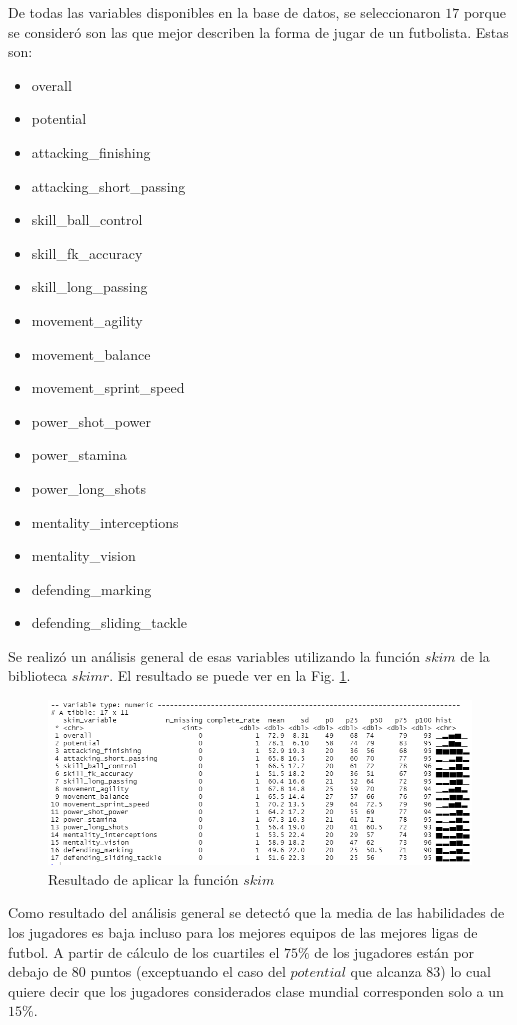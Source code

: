 \documentclass[a4paper,10pt,twocolumn]{article}
\begin{document}
De todas las variables disponibles en la base de datos, se seleccionaron $17$ porque se consideró son las que mejor describen la forma de jugar de un futbolista. Estas son:

\begin{itemize}
	\item overall
	\item potential
	\item attacking\_finishing
	\item attacking\_short\_passing
	\item skill\_ball\_control
	\item skill\_fk\_accuracy
	\item skill\_long\_passing
	\item movement\_agility
	\item movement\_balance
	\item movement\_sprint\_speed
	\item power\_shot\_power
	\item power\_stamina
	\item power\_long\_shots
	\item mentality\_interceptions
	\item mentality\_vision
	\item defending\_marking
	\item defending\_sliding\_tackle
\end{itemize}

Se realizó un análisis general de esas variables utilizando la función $skim$ de la biblioteca $skimr$. El resultado se puede ver en la Fig. \ref{fig:skim}.

\begin{figure}[htb]%
	\begin{center}
		\includegraphics[width=\linewidth]{skim}
	\end{center}
	\caption{Resultado de aplicar la función $skim$ \label{fig:skim}}%
\end{figure}

Como resultado del análisis general se detectó que la media de las habilidades de los jugadores es baja incluso para los mejores equipos de las mejores ligas de futbol. A partir de cálculo de los cuartiles el $75\%$ de los jugadores están por debajo de $80$ puntos (exceptuando el caso del $potential$ que alcanza $83$) lo cual quiere decir que los jugadores considerados clase mundial corresponden solo a un $15\%$.
\end{document}
